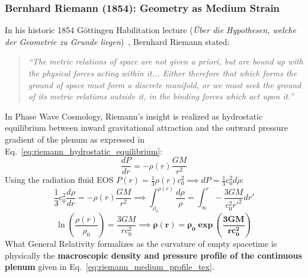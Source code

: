 \documentclass[11pt,a4paper]{article}
\begin{document}
\subsubsection{Bernhard Riemann (1854): Geometry as Medium Strain}
\label{subsubsec:riemann_medium_strain}

In his historic 1854 G\"ottingen Habilitation lecture (\textit{Über die Hypothesen, welche der Geometrie zu Grunde liegen})~\cite{Riemann1854}, Bernhard Riemann stated:
\begin{quote}
\textit{``The metric relations of space are not given a priori, but are bound up with the physical forces acting within it... Either therefore that which forms the ground of space must form a discrete manifold, or we must seek the ground of its metric relations outside it, in the binding forces which act upon it.''}
\end{quote}

In Phase Wave Cosmology, Riemann's insight is realized as hydrostatic equilibrium between inward gravitational attraction and the outward pressure gradient of the plenum as expressed in Eq.~\eqref{eq:riemann_hydrostatic_equilibrium}:
\begin{equation}
\frac{dP}{dr} = -\rho(r) \frac{GM}{r^2}
\label{eq:riemann_hydrostatic_equilibrium}
\end{equation}
Using the radiation fluid EOS $P(r) = \frac{1}{3}\rho(r) c_0^2 \implies dP = \frac{1}{3}c_0^2 d\rho$:
\begin{equation}
\frac{1}{3}c_0^2 \frac{d\rho}{dr} = -\rho(r) \frac{GM}{r^2} \implies \int_{\rho_0}^{\rho(r)} \frac{d\rho}{\rho} = \int_\infty^r -\frac{3GM}{c_0^2 r'^2} dr'
\end{equation}
\begin{equation}
\ln\left(\frac{\rho(r)}{\rho_0}\right) = \frac{3GM}{r c_0^2} \implies \mathbf{\rho(r) = \rho_0 \exp\left( \frac{3GM}{r c_0^2} \right)}
\label{eq:riemann_medium_profile_tex}
\end{equation}
What General Relativity formalizes as the curvature of empty spacetime is physically the \textbf{macroscopic density and pressure profile of the continuous plenum} given in Eq.~\eqref{eq:riemann_medium_profile_tex}.
\end{document}
